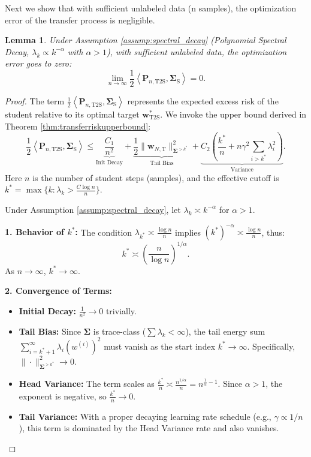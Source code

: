 \documentclass{article}
\theoremstyle{definition}
\theoremstyle{definition}
\theoremstyle{plain}
\theoremstyle{plain}
\theoremstyle{plain}
\newtheorem{lemma}{Lemma}
\theoremstyle{plain}
\theoremstyle{plain}
\newcommand{\bs}[1]{\boldsymbol{\mathbf{#1}}}
\newcommand{\te}{\mathrm{T}}
\newcommand{\st}{\mathrm{S}}
\newcommand{\ts}{\mathrm{T2S}}
\newcommand{\Sig}{\mathbf{\Sigma}}
\newcommand{\w}{\mathbf{w}}
\newcommand{\inner}[1]{\left\langle#1\right\rangle}
\begin{document}
Next we show that with sufficient unlabeled data (n samples), the optimization error of the transfer process is negligible.

\begin{lemma}
    Under Assumption \ref{assump:spectral_decay} (Polynomial Spectral Decay, $\lambda_k \propto k^{-\alpha}$ with $\alpha > 1$), with sufficient unlabeled data, the optimization error goes to zero:
    \begin{equation}
        \lim_{n\rightarrow\infty} \frac{1}{2}\inner{\bs P_{n,\ts},\Sig_{\st}} = 0.
    \end{equation}
\end{lemma}

\begin{proof}
    The term $\frac{1}{2}\inner{\bs P_{n,\ts},\Sig_{\st}}$ represents the expected excess risk of the student relative to its optimal target $\w^*_\ts$. We invoke the upper bound derived in Theorem \ref{thm:transferriskupperbound}:
    \begin{equation}
        \frac{1}{2}\inner{\bs P_{n,\ts},\Sig_{\st}} \leq \underbrace{\frac{C_1}{n^2}}_{\text{Init Decay}} + \underbrace{\frac{1}{2}\|\w_{N,\te}\|^2_{\Sig^{>k^*}}}_{\text{Tail Bias}} + \underbrace{C_2 \left( \frac{k^*}{n} + n \gamma^2 \sum_{i > k^*} \lambda_{i}^2 \right)}_{\text{Variance}}.
    \end{equation}
    Here $n$ is the number of student steps (samples), and the effective cutoff is $k^* = \max\{k:\lambda_{k} > \frac{C \log n}{n} \}$.
    
    Under Assumption \ref{assump:spectral_decay}, let $\lambda_k \asymp k^{-\alpha}$ for $\alpha > 1$.
    
    \textbf{1. Behavior of $k^*$:}
    The condition $\lambda_{k^*} \asymp \frac{\log n}{n}$ implies $(k^*)^{-\alpha} \asymp \frac{\log n}{n}$, thus:
    \begin{equation}
        k^* \asymp \left( \frac{n}{\log n} \right)^{1/\alpha}.
    \end{equation}
    As $n \to \infty$, $k^* \to \infty$.
    
    \textbf{2. Convergence of Terms:}
    \begin{itemize}
        \item \textbf{Initial Decay:} $\frac{1}{n^2} \to 0$ trivially.
        \item \textbf{Tail Bias:} Since $\bs\Sigma$ is trace-class ($\sum \lambda_k < \infty$), the tail energy sum $\sum_{i=k^*+1}^\infty \lambda_i (w^{(i)})^2$ must vanish as the start index $k^* \to \infty$. Specifically, $\|\cdot\|_{\Sig^{>k^*}}^2 \to 0$.
        \item \textbf{Head Variance:} The term scales as $\frac{k^*}{n} \asymp \frac{n^{1/\alpha}}{n} = n^{\frac{1}{\alpha}-1}$. Since $\alpha > 1$, the exponent is negative, so $\frac{k^*}{n} \to 0$.
        \item \textbf{Tail Variance:} With a proper decaying learning rate schedule (e.g., $\gamma \propto 1/n$), this term is dominated by the Head Variance rate and also vanishes.
    \end{itemize}
    

\end{proof}
\end{document}
